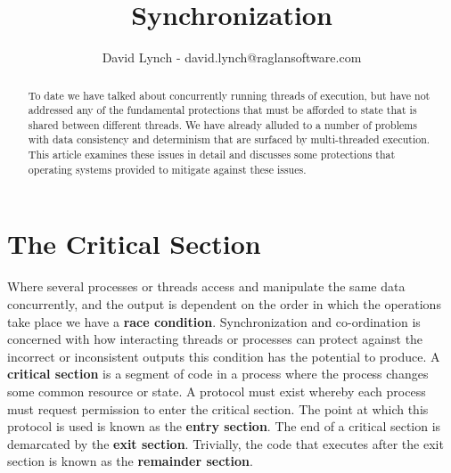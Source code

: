 \documentclass[10pt,a4paper]{article}
\title{Synchronization}
\author{David Lynch - david.lynch@raglansoftware.com }
\begin{document}
\maketitle
\begin{abstract}
To date we have talked about concurrently running threads of execution, but have not addressed any of the fundamental protections that must be afforded to state that is shared between different threads. We have already alluded to a number of problems with data consistency and determinism that are surfaced by multi-threaded execution. This article examines these issues in detail and discusses some protections that operating systems provided to mitigate against these issues.
\end{abstract}
\section{The Critical Section}
Where several processes or threads access and manipulate the same data concurrently, and the output is dependent on the order in which the operations take place we have a {\bf race condition}. Synchronization and co-ordination is concerned with how interacting threads or processes can protect against the incorrect or inconsistent outputs this condition has the potential to produce. A {\bf critical section} is a segment of code in a process where the process changes some common resource or state. A protocol must exist whereby each process must request permission to enter the critical section. The point at which this protocol is used is known as the {\bf entry section}. The end of a critical section is demarcated by the {\bf exit section}. Trivially, the code that executes after the exit section is known as the {\bf remainder section}.
\end{document}
